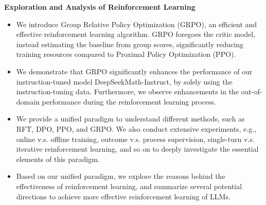 \noindent
\textbf{Exploration and Analysis of Reinforcement Learning}
\begin{itemize}[topsep=0pt]
    \item We introduce Group Relative Policy Optimization (GRPO), an efficient and effective reinforcement learning algorithm. GRPO foregoes the critic model, instead estimating the baseline from group scores, significantly reducing training resources compared to Proximal Policy Optimization (PPO).
    \item We demonstrate that GRPO significantly enhances the performance of our instruction-tuned model DeepSeekMath-Instruct, by solely using the instruction-tuning data. 
    Furthermore, we observe enhancements in the out-of-domain performance during the reinforcement learning process.
    \item We provide a unified paradigm to understand different methods, such as RFT, DPO, PPO, and GRPO. We also conduct extensive experiments, e.g., online v.s. offline training, outcome v.s. process supervision, single-turn v.s. iterative reinforcement learning, and so on to deeply investigate the essential elements of this paradigm.
    \item Based on our unified paradigm, we explore the reasons behind the effectiveness of reinforcement learning, and summarize several potential directions to achieve more effective reinforcement learning of LLMs.
\end{itemize}


